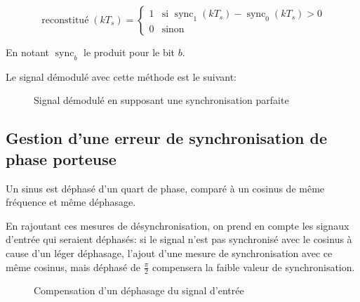 \documentclass{article}
\begin{document}
$$
\operatorname{reconstitué}(kT_s) = \begin{cases}
    1 & \text{si } \operatorname{sync}_1(kT_s) - \operatorname{sync}_0(kT_s) > 0 \\
    0 & \text{sinon}
\end{cases}
$$

En notant $\operatorname{sync}_b$ le produit pour le bit $b$.

Le signal démodulé avec cette méthode est le suivant:


\begin{figure}
\end{figure}

\begin{figure}[H]
	\centering

	\caption{Signal démodulé en supposant une synchronisation parfaite}
	\label{fig:synchro-parfaite}
\end{figure}



\subsection{Gestion d'une erreur de synchronisation de phase porteuse}

Un sinus est déphasé d'un quart de phase, comparé à un cosinus de même fréquence et même déphasage.

En rajoutant ces mesures de désynchronisation, on prend en compte les signaux d'entrée qui seraient déphasés: si le signal n'est pas synchronisé avec le cosinus à cause d'un léger déphasage, l'ajout d'une mesure de synchronisation avec ce même cosinus, mais déphasé de $\frac{\pi}{2}$ compensera la faible valeur de synchronisation.

\begin{figure}[H]
	\centering
	\caption{Compensation d'un déphasage du signal d'entrée}
	\label{fig:compensation-dephasage}
\end{figure}
\end{document}
